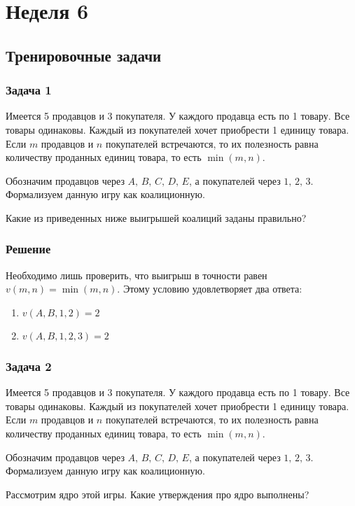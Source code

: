 	\section{Неделя 6}
	
	\subsection{Тренировочные задачи}
	
	\subsubsection{Задача 1}
	Имеется 5 продавцов и 3 покупателя. У каждого продавца есть по 1 товару. Все товары одинаковы. Каждый из покупателей хочет приобрести 1 единицу товара. Если $m$ продавцов и $n$ покупателей встречаются, то их полезность равна количеству проданных единиц товара, то есть $\min (m, n)$.
	
	Обозначим продавцов через $A,\,B,\,C,\,D,\,E$, а покупателей через $1,\,2,\,3$. Формализуем данную игру как коалиционную.
	
	Какие из приведенных ниже выигрышей коалиций заданы правильно?
	
	\subsubsection*{Решение}
	Необходимо лишь проверить, что выигрыш в точности равен $v(m, n) = \min(m, n)$. Этому условию удовлетворяет два ответа:
	\begin{enumerate}[label=-]
		\item $v(A, B, 1, 2) = 2$
		\item $v(A, B, 1, 2, 3) = 2$
	\end{enumerate}
		
	\subsubsection{Задача 2}
	Имеется 5 продавцов и 3 покупателя. У каждого продавца есть по 1 товару. Все товары одинаковы. Каждый из покупателей хочет приобрести 1 единицу товара. Если $m$ продавцов и $n$ покупателей встречаются, то их полезность равна количеству проданных единиц товара, то есть $\min(m,n)$.
	
	Обозначим продавцов через $A,\,B,\,C,\,D,\,E$, а покупателей через $1,\,2,\,3$. Формализуем данную игру как коалиционную.
	
	Рассмотрим ядро этой игры. Какие утверждения про ядро выполнены?
	
